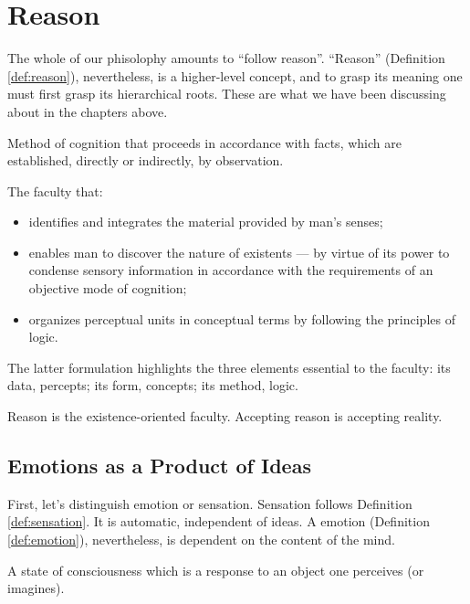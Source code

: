 \chapter{Reason}

    The whole of our phisolophy amounts to ``follow reason''. ``Reason'' (Definition \ref{def:reason}), nevertheless, is a higher-level concept, and to grasp its meaning one must first grasp its hierarchical roots. These are what we have been discussing about in the chapters above.

        \begin{definition}[Reason]
        \label{def:reason}
            Method of cognition that proceeds in accordance with facts, which are established, directly or indirectly, by observation.
            
            The faculty that:
            \begin{itemize}
                \item identifies and integrates the material provided by man's senses;
                \item enables man to discover the nature of existents — by virtue of its power to condense sensory information in accordance with the requirements of an objective mode of cognition;
                \item organizes perceptual units in conceptual terms by following the principles of logic.
            \end{itemize}
        \end{definition}

        \begin{remark}
            The latter formulation highlights the three elements essential to the faculty: its data, percepts; its form, concepts; its method, logic.
        \end{remark}

    Reason is the existence-oriented faculty. Accepting reason is accepting reality.

    \section{Emotions as a Product of Ideas}
    
        First, let's distinguish emotion or sensation. Sensation follows Definition \ref{def:sensation}. It is automatic, independent of ideas. A emotion (Definition \ref{def:emotion}), nevertheless, is dependent on the content of the mind.

            \begin{definition}[Emotion]
                A state of consciousness which is a response to an object one perceives (or imagines).
            \end{definition}

